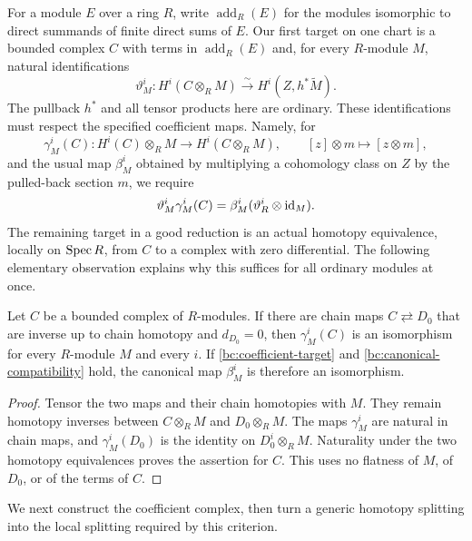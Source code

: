 For a module $E$ over a ring $R$, write $\operatorname{add}_R(E)$ for the
modules isomorphic to direct summands of finite direct sums of $E$.  Our
first target on one chart is a bounded complex $C$ with terms in
$\operatorname{add}_R(E)$ and, for every $R$-module $M$, natural
identifications
\begin{equation}\label{bc:coefficient-target}
 \vartheta_M^i:H^i(C\otimes_R M)
       \xrightarrow{\ \sim\ }H^i(Z,h^*\widetilde M).
\end{equation}
The pullback $h^*$ and all tensor products here are ordinary.
These identifications must respect the specified coefficient maps.  Namely,
for
\[
 \gamma_M^i(C):H^i(C)\otimes_RM\longrightarrow H^i(C\otimes_RM),
 \qquad [z]\otimes m\longmapsto[z\otimes m],
\]
and the usual map $\beta_M^i$ obtained by multiplying a cohomology class
on $Z$ by the pulled-back section $m$, we require
\begin{equation}\label{bc:canonical-compatibility}
 \vartheta_M^i\gamma_M^i(C)
       =\beta_M^i(\vartheta_R^i\otimes\operatorname{id}_M).
\end{equation}
The remaining target in a good reduction is an actual homotopy equivalence,
locally on $\operatorname{Spec} R$, from $C$ to a complex with zero differential.  The
following elementary observation explains why this suffices for all
ordinary modules at once.

\begin{lemma}\label{bc:homotopy-criterion}
Let $C$ be a bounded complex of $R$-modules.  If there are chain maps
$C\rightleftarrows D_0$ that are inverse up to chain homotopy and
$d_{D_0}=0$, then $\gamma_M^i(C)$ is an isomorphism for every $R$-module
$M$ and every $i$.  If \eqref{bc:coefficient-target} and
\eqref{bc:canonical-compatibility} hold, the canonical map $\beta_M^i$
is therefore an isomorphism.
\end{lemma}

\begin{proof}
Tensor the two maps and their chain homotopies with $M$.  They remain
homotopy inverses between $C\otimes_RM$ and $D_0\otimes_RM$.  The maps
$\gamma_M^i$ are natural in chain maps, and
$\gamma_M^i(D_0)$ is the identity on $D_0^i\otimes_RM$.  Naturality
under the two homotopy equivalences proves the assertion for $C$.
This uses no flatness of $M$, of $D_0$, or of the terms of $C$.
\end{proof}

We next construct the coefficient complex, then turn a generic homotopy
splitting into the local splitting required by this criterion.


